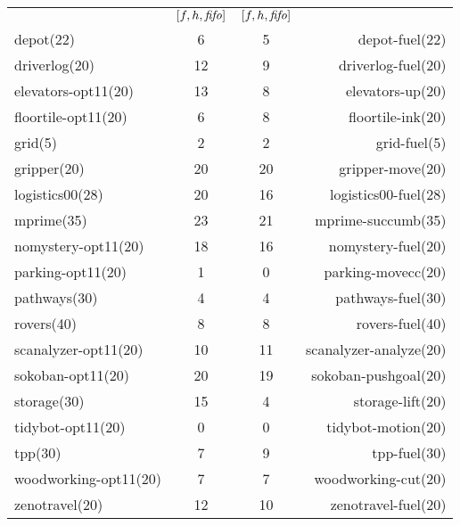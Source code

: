 \begin{center}
\begin{tabular}{|lc|cr|}
 & \([f,h,{\text{\textit{fifo}}}]\) & \([f,h,{\text{\textit{fifo}}}]\) & \\
depot(22) & 6 & 5 & depot-fuel(22)\\
driverlog(20) & 12 & 9 & driverlog-fuel(20)\\
elevators-opt11(20) & 13 & 8 & elevators-up(20)\\
floortile-opt11(20) & 6 & 8 & floortile-ink(20)\\
grid(5) & 2 & 2 & grid-fuel(5)\\
gripper(20) & 20 & 20 & gripper-move(20)\\
logistics00(28) & 20 & 16 & logistics00-fuel(28)\\
mprime(35) & 23 & 21 & mprime-succumb(35)\\
nomystery-opt11(20) & 18 & 16 & nomystery-fuel(20)\\
parking-opt11(20) & 1 & 0 & parking-movecc(20)\\
pathways(30) & 4 & 4 & pathways-fuel(30)\\
rovers(40) & 8 & 8 & rovers-fuel(40)\\
scanalyzer-opt11(20) & 10 & 11 & scanalyzer-analyze(20)\\
sokoban-opt11(20) & 20 & 19 & sokoban-pushgoal(20)\\
storage(30) & 15 & 4 & storage-lift(20)\\
tidybot-opt11(20) & 0 & 0 & tidybot-motion(20)\\
tpp(30) & 7 & 9 & tpp-fuel(30)\\
woodworking-opt11(20) & 7 & 7 & woodworking-cut(20)\\
zenotravel(20) & 12 & 10 & zenotravel-fuel(20)\\
\end{tabular}
\end{center}
